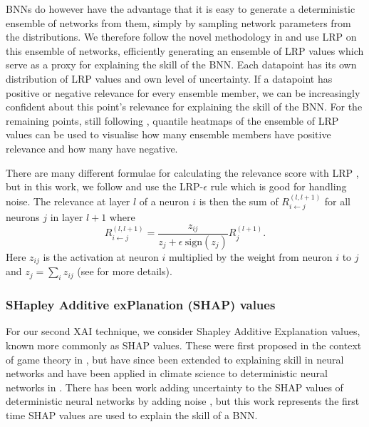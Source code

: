 \documentclass[a4paper]{article}
\begin{document}
BNNs do however have the advantage that it is easy to generate a deterministic ensemble of networks from them, simply by sampling network parameters from the distributions. We therefore follow the novel methodology in \cite{Bykov2020} and use LRP on this ensemble of networks, efficiently generating an ensemble of LRP values which serve as a proxy for explaining the skill of the BNN. Each datapoint has its own distribution of LRP values and own level of uncertainty. If a datapoint has positive or negative relevance for every ensemble member, we can be increasingly confident about this point's relevance for explaining the skill of the BNN. For the remaining points, still following \citep{Bykov2020}, quantile heatmaps of the ensemble of LRP values can be used to visualise how many ensemble members have positive relevance and how many have negative.

There are many different formulae for calculating the relevance score with LRP \citep[see][]{montavon2019layer}, but in this work, we follow \cite{THOR} and use the LRP-$\epsilon$ rule which is good for handling noise. The relevance at layer $l$ of a neuron $i$ is then the sum of $R_{i \leftarrow j}^{(l, l+1)}$ for all neurons $j$ in layer $l+1$ where
\begin{equation}
R_{i \leftarrow j}^{(l, l+1)} = \frac{z_{ij}}{z_{j} + \epsilon \hspace{3pt}\text{sign}(z_{j})} R_{j}^{(l+1)}.
\end{equation}
Here $z_{ij}$ is the activation at neuron $i$ multiplied by the weight from neuron $i$ to $j$ and $z_{j} = \sum_{i}z_{ij}$ (see \cite{montavon2019layer} for more details).

\subsubsection{SHapley Additive exPlanation (SHAP) values}\label{sec:shap_method}
For our second XAI technique, we consider Shapley Additive Explanation values, known more commonly as SHAP values. These were first proposed in the context of game theory in \cite{shapley1997value}, but have since been extended to explaining skill in neural networks \citep{lundberg2017unified} and have been applied in climate science to deterministic neural networks in \cite{dikshit2021interpretable,Mamalakis2022}. There has been work adding uncertainty to the SHAP values of deterministic neural networks by adding noise \citep{slack2021reliable}, but this work represents the first time SHAP values are used to explain the skill of a BNN.
\end{document}
